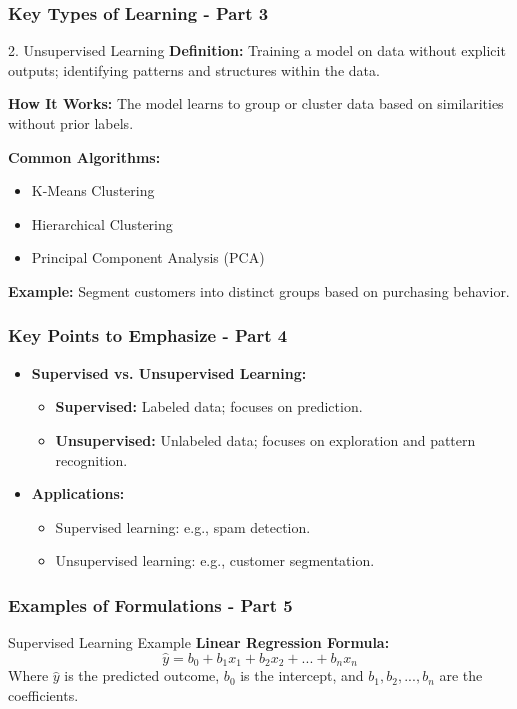 \documentclass[aspectratio=169]{beamer}
\begin{document}
\begin{frame}[fragile]
    \frametitle{Key Types of Learning - Part 3}
    \begin{block}{2. Unsupervised Learning}
        \textbf{Definition:} Training a model on data without explicit outputs; identifying patterns and structures within the data.

        \textbf{How It Works:} 
        The model learns to group or cluster data based on similarities without prior labels.

        \textbf{Common Algorithms:} 
        \begin{itemize}
            \item K-Means Clustering
            \item Hierarchical Clustering
            \item Principal Component Analysis (PCA)
        \end{itemize}

        \textbf{Example:} Segment customers into distinct groups based on purchasing behavior.
    \end{block}
\end{frame}

\begin{frame}[fragile]
    \frametitle{Key Points to Emphasize - Part 4}
    \begin{itemize}
        \item \textbf{Supervised vs. Unsupervised Learning:}
        \begin{itemize}
            \item \textbf{Supervised:} Labeled data; focuses on prediction.
            \item \textbf{Unsupervised:} Unlabeled data; focuses on exploration and pattern recognition.
        \end{itemize}
        \item \textbf{Applications:} 
        \begin{itemize}
            \item Supervised learning: e.g., spam detection.
            \item Unsupervised learning: e.g., customer segmentation.
        \end{itemize}
    \end{itemize}
\end{frame}

\begin{frame}[fragile]
    \frametitle{Examples of Formulations - Part 5}
    \begin{block}{Supervised Learning Example}
        \textbf{Linear Regression Formula:}
        \begin{equation}
        \hat{y} = b_0 + b_1x_1 + b_2x_2 + ... + b_nx_n
        \end{equation}
        Where $\hat{y}$ is the predicted outcome, $b_0$ is the intercept, and $b_1, b_2, ..., b_n$ are the coefficients.
    \end{block}
\end{frame}
\end{document}
